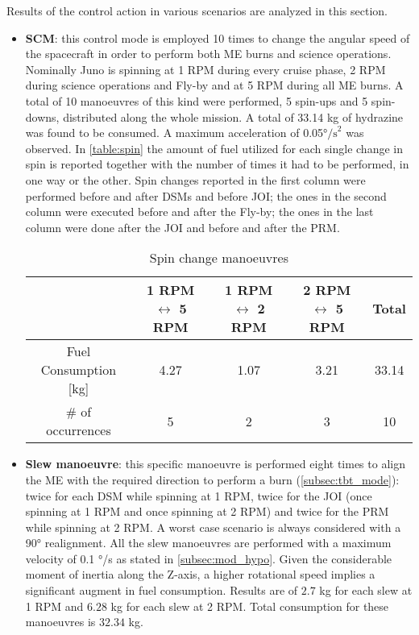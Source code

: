 Results of the control action in various scenarios are analyzed in this section.
\begin{itemize}
    \item \textbf{SCM}: this control mode is employed 10 times to change the angular speed of the spacecraft in order to perform both ME burns and science operations. Nominally Juno is spinning at 1 RPM during every cruise phase, 2 RPM during science operations and Fly-by and at 5 RPM during all ME burns. A total of 10 manoeuvres of this kind were performed, 5 spin-ups and 5 spin-downs, distributed along the whole mission.  A total of 33.14 kg of hydrazine was found to be consumed. A maximum acceleration of 0.05°$\textrm{/s}^2$ was observed. In \autoref{table:spin} the amount of fuel utilized for each single change in spin is reported together with the number of times it had to be performed, in one way or the other. Spin changes reported in the first column were performed before and after DSMs and before JOI; the ones in the second column were executed before and after the Fly-by; the ones in the last column were done after the JOI and before and after the PRM.
    
    \begin{table}[H]
        \renewcommand{\arraystretch}{1.3}
        \centering
        \small
        \begin{tabular}{|c|c|c|c|c|}
            \hline
            &\textbf{1 RPM $\leftrightarrow$ 5 RPM } & \textbf{1 RPM $\leftrightarrow$ 2 RPM } &\textbf{2 RPM $\leftrightarrow$ 5 RPM} & \textbf{Total} \\
            \hline
            \hline
            Fuel Consumption [kg] & 4.27 & 1.07 & 3.21 & 33.14 \\
            \hline
            \# of occurrences & 5 & 2 & 3 & 10 \\
            \hline
        \end{tabular}
        \caption{Spin change manoeuvres}
        \label{table:spin}
    \end{table}
    \vspace*{-3mm}

    \item \textbf{Slew manoeuvre}: this specific manoeuvre is performed eight times to align the ME with the required direction to perform a burn (\autoref{subsec:tbt_mode}): twice for each DSM while spinning at 1 RPM, twice for the JOI (once spinning at 1 RPM and once spinning at 2 RPM) and twice for the PRM while spinning at 2 RPM. A worst case scenario is always considered with a 90° realignment. \cite{LL_early_cruise} 
    All the slew manoeuvres are performed with a maximum velocity of 0.1 °/s as stated in \autoref{subsec:mod_hypo}. 
    Given the considerable moment of inertia along the Z-axis, a higher rotational speed implies a significant augment in fuel consumption. Results are of $2.7$ kg for each slew at 1 RPM and $6.28$ kg for each slew at 2 RPM. Total consumption for these manoeuvres is $32.34$ kg. 
    

\end{itemize}
